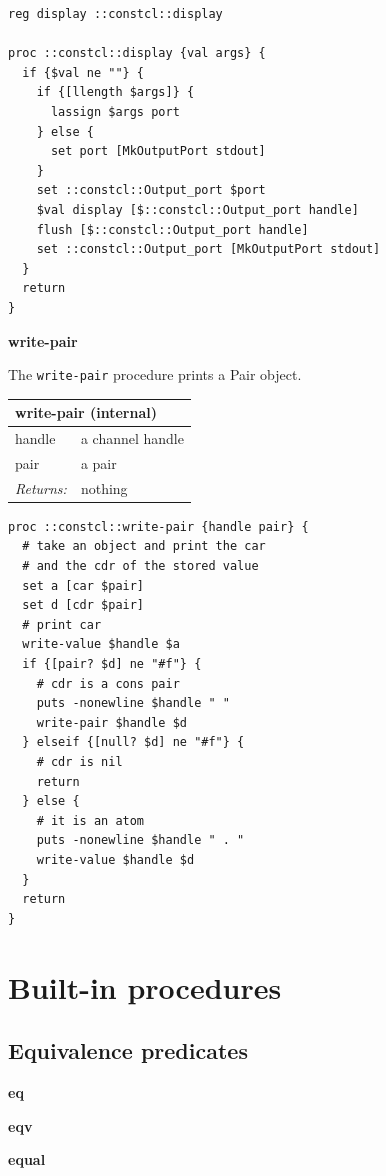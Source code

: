 \documentclass[twoside,9pt]{report}
\begin{document}
\noindent\makebox[\linewidth]{\rule{\linewidth}{0.4pt}}
\begin{lstlisting}
reg display ::constcl::display
 
proc ::constcl::display {val args} {
  if {$val ne ""} {
    if {[llength $args]} {
      lassign $args port
    } else {
      set port [MkOutputPort stdout]
    }
    set ::constcl::Output_port $port
    $val display [$::constcl::Output_port handle]
    flush [$::constcl::Output_port handle]
    set ::constcl::Output_port [MkOutputPort stdout]
  }
  return
}
\end{lstlisting}
\noindent\makebox[\linewidth]{\rule{\linewidth}{0.4pt}}

\textbf{write-pair}


The \texttt{write-pair} procedure prints a Pair object.

\begin{tabular}{ |l l| }
\hline
\multicolumn{2}{|l|}{write-pair (internal)} \\
\hline
handle & a channel handle \\
pair & a pair \\
\textit{Returns:} & nothing \\
\hline
\end{tabular}

\noindent\makebox[\linewidth]{\rule{\linewidth}{0.4pt}}
\begin{lstlisting}
proc ::constcl::write-pair {handle pair} {
  # take an object and print the car
  # and the cdr of the stored value
  set a [car $pair]
  set d [cdr $pair]
  # print car
  write-value $handle $a
  if {[pair? $d] ne "#f"} {
    # cdr is a cons pair
    puts -nonewline $handle " "
    write-pair $handle $d
  } elseif {[null? $d] ne "#f"} {
    # cdr is nil
    return
  } else {
    # it is an atom
    puts -nonewline $handle " . "
    write-value $handle $d
  }
  return
}
\end{lstlisting}
\noindent\makebox[\linewidth]{\rule{\linewidth}{0.4pt}}
\chapter{Built-in procedures}
\label{built-in-procedures}
\section{Equivalence predicates}
\label{equivalence-predicates}

\textbf{eq}


\textbf{eqv}


\textbf{equal}
\end{document}
